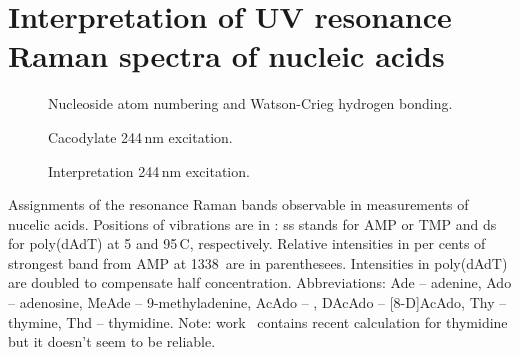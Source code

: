 \section{Interpretation of UV resonance Raman spectra of nucleic acids}

\newlength{\assignwnl}
\settowidth{\assignwnl}{0000}
\newlength{\assignwnil}
\settowidth{\assignwnil}{(000)}
\newlength{\assignwnspl}
\setlength{\assignwnspl}{0.2cm}
\newlength{\assigntabrowindent}
\setlength{\assigntabrowindent}{.7em}



\begin{figure}
	\centering
	
	\caption{Nucleoside atom numbering and Watson-Crieg hydrogen
		bonding.}
	\label{\figlabel{interpretation:at_structure}}
\end{figure}

\begin{figure}
	\centering
	
	\caption{Cacodylate 244\,nm excitation.}
	\label{\figlabel{interpretation:cac}}
\end{figure}

\begin{figure}
	\centering
	
	\caption{Interpretation 244\,nm excitation.}
	\label{\figlabel{interpretation:at}}
\end{figure}

\begin{table}
	\centering
	
	\caption{Assignments of the resonance Raman bands observable in measurements
	  of nucelic acids.
		Positions of vibrations are in \icm{}: ss stands for AMP or TMP and ds for
		poly(dAdT) at 5 and 95\,\textdegree{}C, respectively. Relative intensities
		in per cents of strongest band from AMP at 1338\,\icm{} are in
		parenthesees. Intensities in poly(dAdT) are doubled to compensate half
		concentration. Abbreviations:
			Ade -- adenine,
			Ado -- adenosine,
			MeAde -- 9-methyladenine,
			AcAdo -- ,
			DAcAdo -- [8-D]AcAdo, Thy -- thymine, Thd -- thymidine. Note:
			work~\textcite{Marquez2014} contains recent calculation for thymidine but
			it doesn't seem to be reliable.}
	\label{\tablabel{interpretation:at}}
\end{table}


